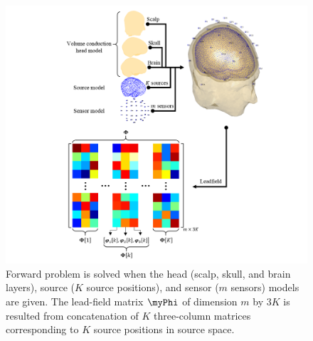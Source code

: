 \begin{figure}[!b]
\centering
\includegraphics[width=1\textwidth]{images/LF.png} %
\caption{Forward problem is solved when the head (scalp, skull, and brain layers), source ($K$ source positions), and sensor ($m$ sensors) models are given.
The lead-field matrix $\myPhi$ of dimension $m$ by $3K$ is resulted from concatenation of $K$ three-column matrices corresponding to $K$ source positions in source space.
}
\label{fig:LF}
\end{figure}